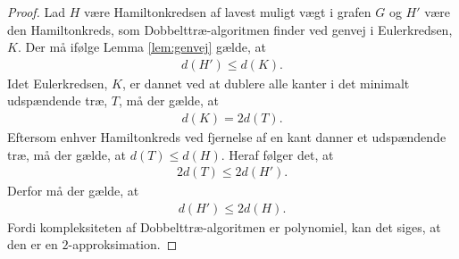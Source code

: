 \begin{proof}
Lad $H$ være Hamiltonkredsen af lavest muligt vægt i grafen $G$ og $H'$ være den Hamiltonkreds, som Dobbelttræ-algoritmen finder ved genvej i Eulerkredsen, $K$. Der må ifølge Lemma \ref{lem:genvej} gælde, at 
\begin{align*}
	d(H')\leq d(K).
\end{align*}
Idet Eulerkredsen, $K$, er dannet ved at dublere alle kanter i det minimalt udspændende træ, $T$, må der gælde, at 
\begin{align*}
	d(K) = 2d(T).
\end{align*}
Eftersom enhver Hamiltonkreds ved fjernelse af en kant danner et udspændende træ, må der gælde, at $d(T) \leq d(H)$.
	Heraf følger det, at
	\begin{align*}
		2d(T) \leq 2d(H').
	\end{align*}
Derfor må der gælde, at 
	\begin{align*}
		d(H') \leq 2d(H).
	\end{align*}
	Fordi kompleksiteten af Dobbelttræ-algoritmen er polynomiel, kan det siges, at den er en $2$-approksimation. 
\end{proof}
